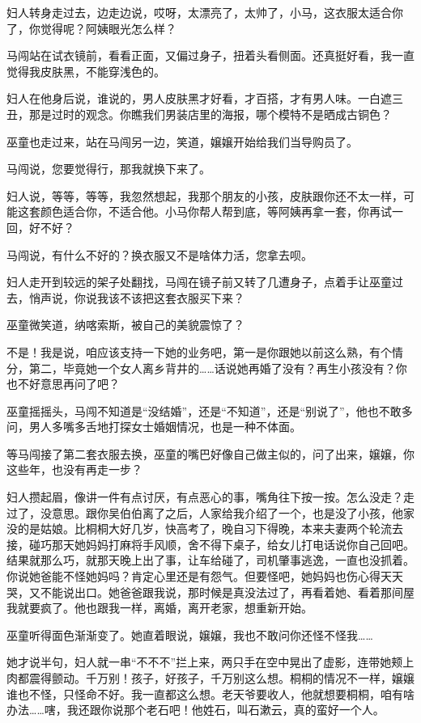 \documentclass[lang=cn,newtx,12pt,scheme=chinese]{elegantbook}
\begin{document}
妇人转身走过去，边走边说，哎呀，太漂亮了，太帅了，小马，这衣服太适合你了，你觉得呢？阿姨眼光怎么样？

马闯站在试衣镜前，看看正面，又偏过身子，扭着头看侧面。还真挺好看，我一直觉得我皮肤黑，不能穿浅色的。

妇人在他身后说，谁说的，男人皮肤黑才好看，才百搭，才有男人味。一白遮三丑，那是过时的观念。你瞧我们男装店里的海报，哪个模特不是晒成古铜色？

巫童也走过来，站在马闯另一边，笑道，嬢嬢开始给我们当导购员了。

马闯说，您要觉得行，那我就换下来了。

妇人说，等等，等等，我忽然想起，我那个朋友的小孩，皮肤跟你还不太一样，可能这套颜色适合你，不适合他。小马你帮人帮到底，等阿姨再拿一套，你再试一回，好不好？

马闯说，有什么不好的？换衣服又不是啥体力活，您拿去呗。

妇人走开到较远的架子处翻找，马闯在镜子前又转了几遭身子，点着手让巫童过去，悄声说，你说我该不该把这套衣服买下来？

巫童微笑道，纳喀索斯，被自己的美貌震惊了？

不是！我是说，咱应该支持一下她的业务吧，第一是你跟她以前这么熟，有个情分，第二，毕竟她一个女人离乡背井的……话说她再婚了没有？再生小孩没有？你也不好意思再问了吧？

巫童摇摇头，马闯不知道是“没结婚”，还是“不知道”，还是“别说了”，他也不敢多问，男人多嘴多舌地打探女士婚姻情况，也是一种不体面。

等马闯接了第二套衣服去换，巫童的嘴巴好像自己做主似的，问了出来，嬢嬢，你这些年，也没有再走一步？

妇人攒起眉，像讲一件有点讨厌，有点恶心的事，嘴角往下按一按。怎么没走？走过了，没意思。跟你吴伯伯离了之后，人家给我介绍了一个，也是没了小孩，他家没的是姑娘。比桐桐大好几岁，快高考了，晚自习下得晚，本来夫妻两个轮流去接，碰巧那天她妈妈打麻将手风顺，舍不得下桌子，给女儿打电话说你自己回吧。结果就那么巧，就那天晚上出了事，让车给碰了，司机肇事逃逸，一直也没抓着。你说她爸能不怪她妈吗？肯定心里还是有怨气。但要怪吧，她妈妈也伤心得天天哭，又不能说出口。她爸爸跟我说，那时候是真没法过了，再看着她、看着那间屋我就要疯了。他也跟我一样，离婚，离开老家，想重新开始。

巫童听得面色渐渐变了。她直着眼说，嬢嬢，我也不敢问你还怪不怪我……

她才说半句，妇人就一串“不不不”拦上来，两只手在空中晃出了虚影，连带她颊上肉都震得颤动。千万别！孩子，好孩子，千万别这么想。桐桐的情况不一样，嬢嬢谁也不怪，只怪命不好。我一直都这么想。老天爷要收人，他就想要桐桐，咱有啥办法……嗐，我还跟你说那个老石吧！他姓石，叫石漱云，真的蛮好一个人。
\end{document}
